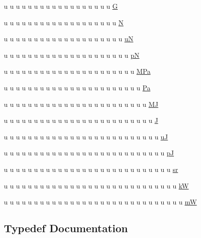 \begin{DoxyCompactItemize}
\item 
u u u u u u u u u u u u u u u u u u \hyperlink{namespacemui_1_1dim_abcfaf2a372e8eb97b64636b12470a415}{G}
\item 
u u u u u u u u u u u u u u u u u u u \hyperlink{namespacemui_1_1dim_aad58f5aea584b3f383c82a72c0b5ce88}{N}
\item 
u u u u u u u u u u u u u u u u u u u u \hyperlink{namespacemui_1_1dim_a1aef70c16f2a65b9bc88c6f35245b805}{uN}
\item 
u u u u u u u u u u u u u u u u u u u u u \hyperlink{namespacemui_1_1dim_a9c7ee642d5f22288d38e9572cf4049e6}{pN}
\item 
u u u u u u u u u u u u u u u u u u u u u u \hyperlink{namespacemui_1_1dim_a219f6a5e879a3a55ff6b40b84064057f}{M\+Pa}
\item 
u u u u u u u u u u u u u u u u u u u u u u u \hyperlink{namespacemui_1_1dim_ab7b0341ec845d198c905871112957c63}{Pa}
\item 
u u u u u u u u u u u u u u u u u u u u u u u u \hyperlink{namespacemui_1_1dim_aba957082383183fd16e7ef32445f1fff}{MJ}
\item 
u u u u u u u u u u u u u u u u u u u u u u u u u \hyperlink{namespacemui_1_1dim_ae9fdd89d8511c2f222a0630d6830c5ef}{J}
\item 
u u u u u u u u u u u u u u u u u u u u u u u u u u \hyperlink{namespacemui_1_1dim_a0fe972a1aaf2a7eb078e0883682a5434}{uJ}
\item 
u u u u u u u u u u u u u u u u u u u u u u u u u u u \hyperlink{namespacemui_1_1dim_a61a8c4d0743f6ff2d66735b4a8863b6d}{pJ}
\item 
u u u u u u u u u u u u u u u u u u u u u u u u u u u u \hyperlink{namespacemui_1_1dim_a3cf7f5a09f87d2ab1b53eade861a1a17}{sr}
\item 
u u u u u u u u u u u u u u u u u u u u u u u u u u u u u \hyperlink{namespacemui_1_1dim_ab52f8f7546dbde8f12b768a0f5231b6c}{kW}
\item 
u u u u u u u u u u u u u u u u u u u u u u u u u u u u u u \hyperlink{namespacemui_1_1dim_a39afd21f8e0f27f6b4a2b7011074c2fd}{mW}
\end{DoxyCompactItemize}


\subsection{Typedef Documentation}
\mbox{\label{namespacemui_1_1dim_aec150f5d30ea4484d99cbfaf1d6f80c9}} 
